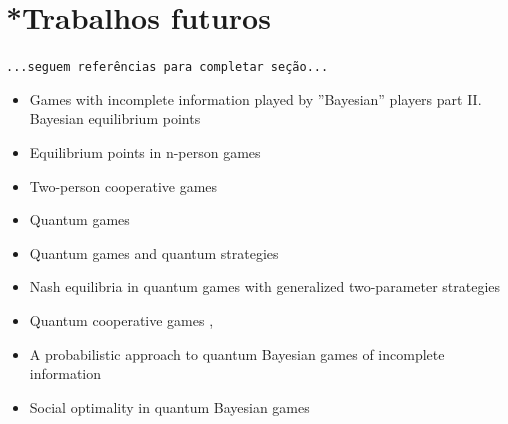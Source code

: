 \documentclass[
	article,			        %
	11pt,				          %
	oneside,			        %
	a4paper,			        %
	english,			        %
	brazil,				        %
	sumario=tradicional
]{abntex2}\usepackage[]{graphicx}\usepackage[]{color}
\begin{document}
\section{*Trabalhos futuros}

  \texttt{\color{red}...seguem referências para completar seção...}
  \begin{itemize}
    \item Games with incomplete information played by ''Bayesian'' players part II. Bayesian equilibrium points \cite{Harsanyi.1968}
    \item Equilibrium points in n-person games \cite{Nash.1950}
    \item Two-person cooperative games \cite{Nash.1953}
    \item Quantum games \cite{JoseFigueiredo.2004}
    \item Quantum games and quantum strategies \cite{Eisert.1999}
    \item Nash equilibria in quantum games with generalized two-parameter strategies \cite{Flitney.2007}
    \item Quantum cooperative games \cite{Iqbal.2002},\cite{Dai.2004}
    \item A probabilistic approach to quantum Bayesian games of incomplete information \cite{Iqbal.2014}
    \item Social optimality in quantum Bayesian games \cite{Azhar.2015}
  \end{itemize}

\postextual





\end{document}
